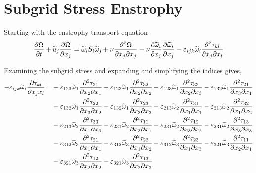 \newcommand{\vort}{\widetilde{\omega}}
\newcommand{\enst}{\Omega}
\section{Subgrid Stress Enstrophy}
Starting with the enstrophy transport equation
\begin{equation}
    \pdv{\enst}{t} + \widetilde{u}_{j} \pdv{\enst}{x_{j}} =
        \vort_{i} S_{i} \vort_{j} + \nu \pdv{\enst}{x_{j}}{x_{j}} -
        \nu \pdv{\vort_{i}}{x_{j}}  \pdv{\vort_{i}}{x_{j}} -
        \varepsilon_{ijk} \vort_{i} \pdv{\tau_{kl}}{x_{j}}{x_{l}}
\end{equation}

Examining the subgrid stress and expanding and simplifying the indices
gives,
\begin{equation}
    \begin{split}
        - \varepsilon_{ijk} \vort_{i} \pdv{\tau_{kl}}{x_{j} x_{l}} = & 
                -\varepsilon_{123} \vort_{1} \pdv{\tau_{31}}{x_{2}}{x_{1}}
                -\varepsilon_{123} \vort_{1} \pdv{\tau_{32}}{x_{2}}{x_{2}}
                -\varepsilon_{123} \vort_{1} \pdv{\tau_{33}}{x_{2}}{x_{3}}
                -\varepsilon_{132} \vort_{1} \pdv{\tau_{21}}{x_{3}}{x_{1}}\\ 
            &   -\varepsilon_{132} \vort_{1} \pdv{\tau_{22}}{x_{3}}{x_{2}} 
                -\varepsilon_{132} \vort_{1} \pdv{\tau_{23}}{x_{3}}{x_{3}} 
                -\varepsilon_{213} \vort_{2} \pdv{\tau_{31}}{x_{1}}{x_{1}} 
                -\varepsilon_{213} \vort_{2} \pdv{\tau_{32}}{x_{1}}{x_{2}}\\ 
            &   -\varepsilon_{213} \vort_{2} \pdv{\tau_{33}}{x_{1}}{x_{3}} 
                -\varepsilon_{231} \vort_{2} \pdv{\tau_{11}}{x_{3}}{x_{1}}
                -\varepsilon_{231} \vort_{2} \pdv{\tau_{12}}{x_{3}}{x_{2}}
                -\varepsilon_{231} \vort_{2} \pdv{\tau_{13}}{x_{3}}{x_{3}}\\
            &   -\varepsilon_{312} \vort_{3} \pdv{\tau_{21}}{x_{1}}{x_{1}}
                -\varepsilon_{312} \vort_{3} \pdv{\tau_{22}}{x_{1}}{x_{2}}
                -\varepsilon_{312} \vort_{3} \pdv{\tau_{23}}{x_{1}}{x_{3}}
                -\varepsilon_{321} \vort_{3} \pdv{\tau_{11}}{x_{2}}{x_{1}}\\
            &   -\varepsilon_{321} \vort_{3} \pdv{\tau_{12}}{x_{2}}{x_{2}}
                -\varepsilon_{321} \vort_{3} \pdv{\tau_{13}}{x_{2}}{x_{3}}
    \end{split}
\end{equation}

